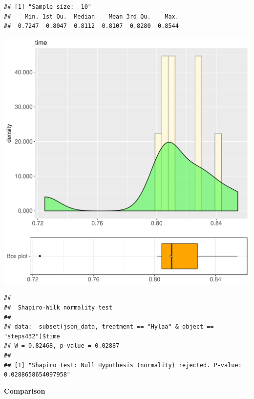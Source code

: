 \documentclass{article}\usepackage[]{graphicx}\usepackage[]{color}
\makeatletter
\def\maxwidth{ %
  \ifdim\Gin@nat@width>\linewidth
    \linewidth
  \else
    \Gin@nat@width
  \fi
}
\newenvironment{kframe}{%
 \def\at@end@of@kframe{}%
 \ifinner\ifhmode%
  \def\at@end@of@kframe{\end{minipage}}%
  \begin{minipage}{\columnwidth}%
 \fi\fi%
 \def\FrameCommand##1{\hskip\@totalleftmargin \hskip-\fboxsep
 \colorbox{shadecolor}{##1}\hskip-\fboxsep
     \hskip-\linewidth \hskip-\@totalleftmargin \hskip\columnwidth}%
 \MakeFramed {\advance\hsize-\width
   \@totalleftmargin\z@ \linewidth\hsize
   \@setminipage}}%
 {\par\unskip\endMakeFramed%
 \at@end@of@kframe}
\newenvironment{knitrout}{}{} %
\makeatother
\begin{document}
\begin{knitrout}
\color{fgcolor}\begin{kframe}
\begin{verbatim}
## [1] "Sample size:  10"
##    Min. 1st Qu.  Median    Mean 3rd Qu.    Max. 
##  0.7247  0.8047  0.8112  0.8107  0.8280  0.8544
\end{verbatim}
\end{kframe}
\includegraphics[width=\maxwidth]{figure/RH3_Hylaa_steps432-1} 
\begin{kframe}\begin{verbatim}
## 
## 	Shapiro-Wilk normality test
## 
## data:  subset(json_data, treatment == "Hylaa" & object == "steps432")$time
## W = 0.82468, p-value = 0.02887
## 
## [1] "Shapiro test: Null Hypothesis (normality) rejected. P-value: 0.0288658654097958"
\end{verbatim}
\end{kframe}
\end{knitrout}
  
 \textbf{Comparison}
  
\end{document}
